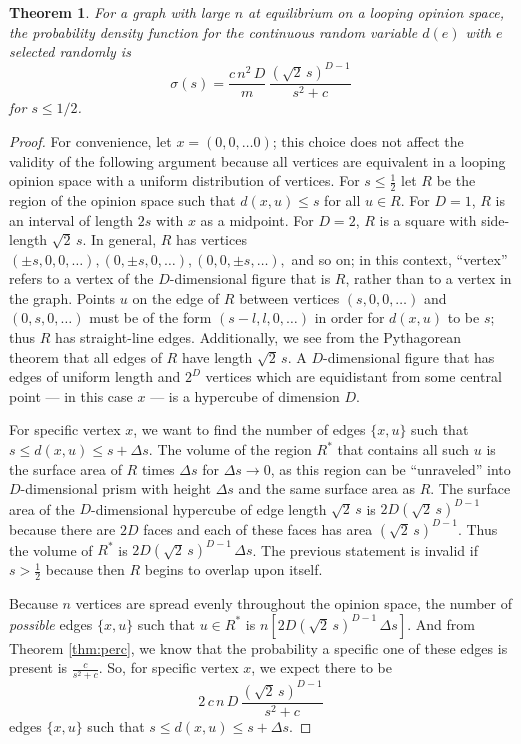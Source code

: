 \documentclass[a4paper,10pt]{article}
\newtheorem{theorem}{Theorem}
\begin{document}
\begin{theorem}
 For a graph with large $n$ at equilibrium on a looping opinion space, the probability density function for the continuous random variable $d(e)$ with $e$ selected randomly is
 \begin{equation}
  \sigma(s) = \frac{c \,n^2\,D}{m}\,\frac{(\sqrt{2}\,s)^{D - 1}}{s^2 + c}
 \end{equation}
for $s \leq 1/2$.
\end{theorem}
\begin{proof}
For convenience, let $x = (0, 0, \ldots 0)$; this choice does not affect the validity of the following argument because all vertices are equivalent in a looping opinion space with a uniform distribution of vertices. For $s \leq \frac{1}{2}$ let $R$ be the region of the opinion space such that $d(x, u) \leq s$ for all $u \in R$. For $D = 1$, $R$ is an interval of length $2s$ with $x$ as a midpoint. For $D = 2$, $R$ is a square with side-length $\sqrt{2}\,s$. In general, $R$ has vertices $(\pm s, 0, 0, \ldots), (0, \pm s, 0, \ldots), (0, 0, \pm s, \ldots),$ and so on; in this context, ``vertex'' refers to a vertex of the $D$-dimensional figure that is $R$, rather than to a vertex in the graph. Points $u$ on the edge of $R$ between vertices $(s, 0, 0, \ldots)$ and $(0, s, 0, \ldots)$ must be of the form $(s - l, l, 0, \ldots)$ in order for $d(x, u)$ to be $s$; thus $R$ has straight-line edges. Additionally, we see from the Pythagorean theorem that all edges of $R$ have length $\sqrt{2}\,s$. A $D$-dimensional 
figure that has edges of uniform length and $2^D$ vertices which are equidistant from some central point --- in this case $x$ --- is a hypercube of dimension $D$. 

For specific vertex $x$, we want to find the number of edges $\{x, u\}$ such that $s \leq d(x, u) \leq s + \Delta s.$ The volume of the region $R^*$ that contains all such $u$ is the surface area of $R$ times $\Delta s$ for $\Delta s \to 0$, as this region can be ``unraveled'' into $D$-dimensional prism with height $\Delta s$ and the same surface area as $R$. The surface area of the $D$-dimensional hypercube of edge length $\sqrt{2}\,s$ is $2D(\sqrt{2}\,s)^{D-1}$ because there are $2D$ faces and each of these faces has area $(\sqrt{2}\,s)^{D-1}$. Thus the volume of $R^*$ is $2D(\sqrt{2}\,s)^{D-1} \, \Delta s$. The previous statement is invalid if $s > \frac{1}{2}$ because then $R$ begins to overlap upon itself.

Because $n$ vertices are spread evenly throughout the opinion space, the number of \emph{possible} edges $\{x, u\}$ such that $u \in R^*$ is $n \left[2D(\sqrt{2}\,s)^{D-1} \, \Delta s\right].$ And from Theorem \ref{thm:perc}, we know that the probability a specific one of these edges is present is $\frac{c}{s^2 + c}$. So, for specific vertex $x$, we expect there to be 
\begin{equation}
2 \,c \,n\,D\,\frac{(\sqrt{2}\,s)^{D - 1}}{s^2 + c} 
\end{equation}
 edges $\{x, u\}$ such that $s \leq d(x, u) \leq s + \Delta s.$ 


\end{proof}
\end{document}
